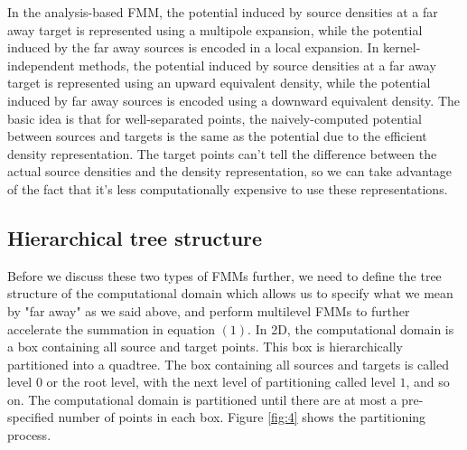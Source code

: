 \documentclass[11pt, oneside]{article}   	%
\begin{document}
In the analysis-based FMM, the potential induced by source densities at a far away target is represented using a multipole expansion, while the potential induced by the far away sources is encoded in a local expansion. In kernel-independent methods, the potential induced by source densities at a far away target is represented using an upward equivalent density, while the potential induced by far away sources is encoded using a downward equivalent density. The basic idea is that for well-separated points, the naively-computed potential between sources and targets is the same as the potential due to the efficient density representation. The target points can't tell the difference between the actual source densities and the density representation, so we can take advantage of the fact that it's less computationally expensive to use these representations.

\subsection{Hierarchical tree structure}
Before we discuss these two types of FMMs further, we need to define the tree structure of the computational domain which allows us to specify what we mean by "far away" as we said above, and perform multilevel FMMs to further accelerate the summation in equation $(1)$. In 2D, the computational domain is a box containing all source and target points. This box is hierarchically partitioned into a quadtree. The box containing all sources and targets is called level $0$ or the root level, with the next level of partitioning called level $1$, and so on. The computational domain is partitioned until there are at most a pre-specified number of points in each box. Figure \ref{fig:4} shows the partitioning process.
\end{document}
